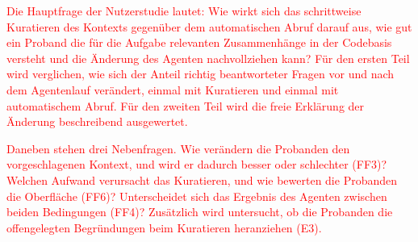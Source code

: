 
\textcolor{red}{Die Hauptfrage der Nutzerstudie lautet: Wie wirkt sich das schrittweise Kuratieren des Kontexts gegenüber dem automatischen Abruf darauf aus, wie gut ein Proband die für die Aufgabe relevanten Zusammenhänge in der Codebasis versteht und die Änderung des Agenten nachvollziehen kann? Für den ersten Teil wird verglichen, wie sich der Anteil richtig beantworteter Fragen vor und nach dem Agentenlauf verändert, einmal mit Kuratieren und einmal mit automatischem Abruf. Für den zweiten Teil wird die freie Erklärung der Änderung beschreibend ausgewertet.}

\textcolor{red}{Daneben stehen drei Nebenfragen. Wie verändern die Probanden den vorgeschlagenen Kontext, und wird er dadurch besser oder schlechter (FF3)? Welchen Aufwand verursacht das Kuratieren, und wie bewerten die Probanden die Oberfläche (FF6)? Unterscheidet sich das Ergebnis des Agenten zwischen beiden Bedingungen (FF4)? Zusätzlich wird untersucht, ob die Probanden die offengelegten Begründungen beim Kuratieren heranziehen (E3).}

